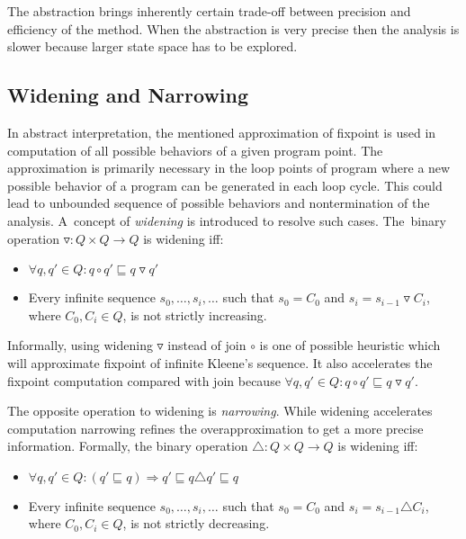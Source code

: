 \documentclass[a4paper, 12pt]{article}
\newcommand{\aord}[0]{\sqsubseteq}
\newcommand{\adom}[0]{Q}
\newcommand{\aitem}[0]{q}
\newcommand{\ajoin}[0]{\circ}
\newcommand{\wid}[0]{\triangledown}
\newcommand{\nar}[0]{\triangle}
\begin{document}
The abstraction brings inherently certain trade-off between
precision and efficiency of the method.
When the abstraction is very precise then the analysis
is slower because larger state space has to be explored.

\subsection{Widening and Narrowing}

In abstract interpretation, the mentioned approximation of fixpoint is
used in computation of all possible behaviors of a given program point.
The approximation is primarily necessary in the loop points of
program where a new possible behavior of a program can be generated
in each loop cycle.
This could lead to unbounded sequence of possible behaviors and
nontermination of the analysis.
A~concept of \emph{widening} is introduced to resolve such cases.
The~binary operation $\wid: \adom \times \adom \rightarrow \adom$ is widening iff:
\begin{itemize}
	\item $\forall \aitem, \aitem' \in \adom: \aitem \ajoin \aitem' \aord \aitem \wid \aitem'$
	\item Every infinite sequence $s_0, \ldots, s_i, \ldots$ such that
		$s_0 = C_0$ and $s_i = s_{i-1} \wid C_i$, where $C_0, C_i \in \adom$,
		is not strictly increasing.
\end{itemize}

Informally, using widening $\wid$ instead of join $\ajoin$ is one of possible heuristic
which will approximate fixpoint of infinite Kleene's sequence.
It also accelerates the fixpoint computation compared with join because
$\forall \aitem, \aitem' \in \adom: \aitem \ajoin \aitem' \aord \aitem \wid \aitem'$.

The opposite operation to widening is \emph{narrowing}.
While widening accelerates computation narrowing
refines the overapproximation to get a more precise information.
Formally, the binary operation $\nar: \adom \times \adom \rightarrow \adom$
is widening iff:
\begin{itemize}
	\item $\forall \aitem, \aitem' \in \adom: (\aitem' \aord \aitem) \Rightarrow \aitem' \aord \aitem \nar \aitem' \aord \aitem$
	\item Every infinite sequence $s_0, \ldots, s_i, \ldots$ such that
		$s_0 = C_0$ and $s_i = s_{i-1} \nar C_i$, where $C_0, C_i \in \adom$,
		is not strictly decreasing.
\end{itemize}
\end{document}
